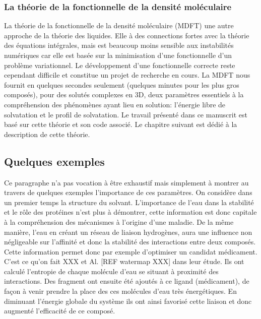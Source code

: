 \subsubsection{La théorie de la fonctionnelle de la densité moléculaire}
La théorie de la fonctionnelle de la densité moléculaire (MDFT) une autre approche de la théorie des liquides. Elle à des connections fortes avec la théorie des équations intégrales, mais est beaucoup moins sensible aux instabilités numériques car elle est basée sur la minimisation d'une fonctionnelle d'un problème variationnel. Le développement d'une fonctionnelle correcte reste cependant difficile et constitue un projet de recherche en cours. La MDFT nous fournit en quelques secondes seulement (quelques minutes pour les plus gros composés), pour des solutés complexes en 3D, deux paramètres essentiels à la compréhension des phénomènes ayant lieu en solution: l'énergie libre de solvatation et le profil de solvatation. Le travail présenté dans ce manuscrit est basé sur cette théorie et son code associé. Le chapitre suivant est dédié à la description de cette théorie.




















\subsection{Quelques exemples}
Ce paragraphe n'a pas vocation à être exhaustif mais simplement à montrer au travers de quelques exemples l'importance de ces paramètres. On considère dans un premier temps la structure du solvant. L'importance de l'eau dans la stabilité et le rôle des protéines n'est plus à démontrer, cette information est donc capitale à la compréhension des mécanismes à l'origine d'une maladie. De la même manière, l'eau en créant un réseau de liaison hydrogènes, aura une influence non négligeable sur l'affinité et donc la stabilité des interactions entre deux composés. Cette information permet donc par exemple d'optimiser un candidat médicament. C'est ce qu'on fait XXX et Al. [REF watermap XXX] dans leur étude. Ils ont calculé l’entropie de chaque molécule d'eau se situant à proximité des interactions. Des fragment ont ensuite été ajoutés à ce ligand (médicament), de façon à venir prendre la place des ces molécules d'eau très énergétiques. En diminuant l'énergie globale du système ils ont ainsi favorisé cette liaison et donc augmenté l'efficacité de ce composé.

